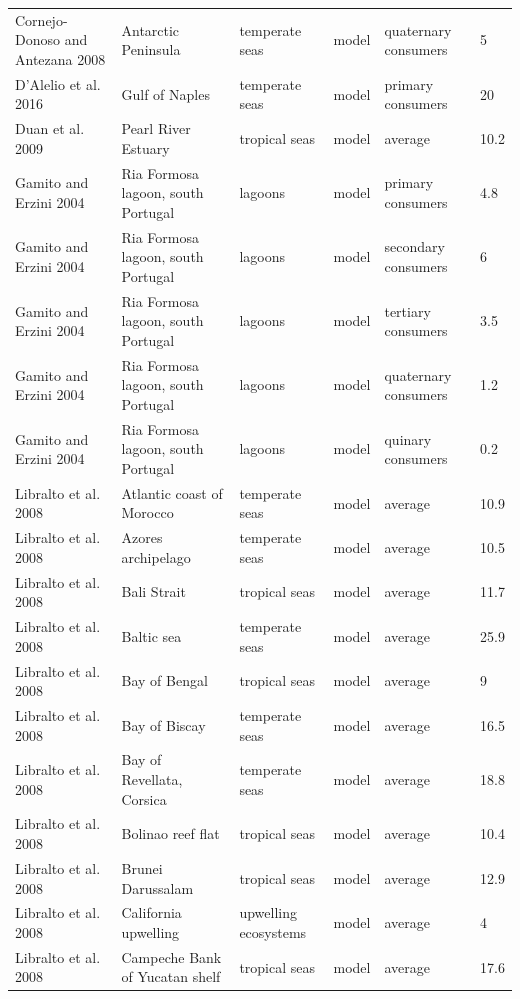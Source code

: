 \documentclass[oneside,12pt,final]{sty/ucthesis-CA2012}
\begin{document}
\begin{mainmatter}
\begin{longtable} {p{3cm}p{3cm}p{1.8cm}lp{2cm}p{1.7cm}}
    Cornejo-Donoso and Antezana 2008   & Antarctic Peninsula & temperate seas & model & quaternary consumers & 5 \\
    D'Alelio et al. 2016   & Gulf of Naples & temperate seas & model & primary consumers & 20 \\
    Duan et al. 2009  & Pearl River Estuary & tropical seas & model & average & 10.2 \\
    Gamito and Erzini 2004  & Ria Formosa lagoon, south Portugal & lagoons & model & primary consumers & 4.8 \\
    Gamito and Erzini 2004   & Ria Formosa lagoon, south Portugal & lagoons & model & secondary consumers & 6 \\
    Gamito and Erzini 2004   & Ria Formosa lagoon, south Portugal & lagoons & model & tertiary consumers & 3.5 \\
    Gamito and Erzini 2004   & Ria Formosa lagoon, south Portugal & lagoons & model & quaternary consumers & 1.2 \\
    Gamito and Erzini 2004   & Ria Formosa lagoon, south Portugal & lagoons & model & quinary consumers & 0.2 \\
    Libralto et al. 2008   & Atlantic coast of Morocco  & temperate seas & model & average & 10.9 \\
    Libralto et al. 2008   & Azores archipelago & temperate seas & model & average & 10.5 \\
    Libralto et al. 2008   & Bali Strait & tropical seas & model & average & 11.7 \\
    Libralto et al. 2008   & Baltic sea & temperate seas & model & average & 25.9 \\
    Libralto et al. 2008  & Bay of Bengal & tropical seas & model & average & 9 \\
    Libralto et al. 2008   & Bay of Biscay & temperate seas & model & average & 16.5 \\
    Libralto et al. 2008   & Bay of Revellata, Corsica & temperate seas & model & average & 18.8 \\
    Libralto et al. 2008   & Bolinao reef flat & tropical seas & model & average & 10.4 \\
    Libralto et al. 2008   & Brunei Darussalam & tropical seas & model & average & 12.9 \\
    Libralto et al. 2008  & California upwelling & upwelling ecosystems & model & average & 4 \\
    Libralto et al. 2008  & Campeche Bank of Yucatan shelf & tropical seas & model & average & 17.6 \\

\end{longtable}
\end{mainmatter}
\end{document}

